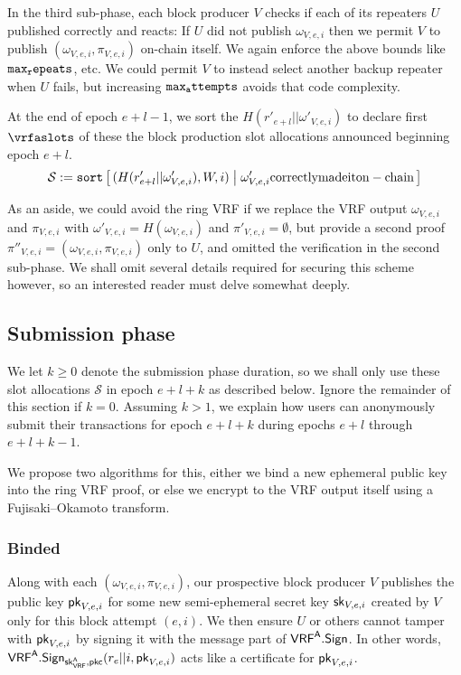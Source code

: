 In the third sub-phase, each block producer $V$ checks if each of its repeaters $U$ published correctly and reacts:  If $U$ did not publish $\omega_{V,e,i}$ then we permit $V$ to publish $(\omega_{V,e,i},\pi_{V,e,i})$ on-chain itself.  We again enforce the above bounds like $\mathtt{max_repeats}$, etc.  We could permit $V$ to instead select another backup repeater when $U$ fails, but increasing $\mathtt{max_attempts}$ avoids that code complexity.

At the end of epoch $e+l-1$, we sort the $H(r'_{e+l} || \omega'_{V,e,i})$ to declare first $\vrfaslots$ of these the block production slot allocations announced beginning epoch $e+l$.  
$$ \mathcal{S} := \mathtt{sort} \Listst{ 
  (H(r'_{e+l} || \omega'_{V,e,i}),W,i) 
}{ 
  \omega'_{V,e,i} \mathrm{ correctly made it on-chain}
} $$

As an aside, we could avoid the ring VRF if we replace the VRF output $\omega_{V,e,i}$ and $\pi_{V,e,i}$ with $\omega'_{V,e,i} = H(\omega_{V,e,i})$ and $\pi'_{V,e,i} = \emptyset$, but provide a second proof $\pi''_{V,e,i} = (\omega_{V,e,i},\pi_{V,e,i})$ only to $U$, and omitted the verification in the second sub-phase.  We shall omit several details required for securing this scheme however, so an interested reader must delve somewhat deeply.


\subsection{Submission phase}\label{subsec:submission_phase}

We let $k \ge 0$ denote the submission phase duration, so we shall only use these slot allocations $\mathcal{S}$ in epoch $e+l+k$ as described below.  Ignore the remainder of this section if $k=0$.  Assuming $k>1$, we explain how users can anonymously submit their transactions for epoch $e+l+k$ during epochs $e+l$ through $e+l+k-1$.

We propose two algorithms for this, either we bind a new ephemeral public key into the ring VRF proof, or else we encrypt to the VRF output itself using a Fujisaki–Okamoto transform. 

\subsubsection{Binded}

Along with each $(\omega_{V,e,i},\pi_{V,e,i})$, our prospective block producer $V$ publishes the public key $\mathsf{pk}_{V,e,i}$ for some new semi-ephemeral secret key $\mathsf{sk}_{V,e,i}$ created by $V$ only for this block attempt $(e,i)$.  We then ensure $U$ or others cannot tamper with $\mathsf{pk}_{V,e,i}$ by signing it with the message part of $\mathsf{VRF}^{\mathsf{A}}.\mathsf{Sign}$.  In other words, $\mathsf{VRF}^{\mathsf{A}}.\mathsf{Sign}_{\mathsf{sk}_{\mathsf{VRF}}^{\mathsf{A}},\mathsf{pkc}}(r_e || i, \mathsf{pk}_{V,e,i})$ acts like a certificate for $\mathsf{pk}_{V,e,i}$.

